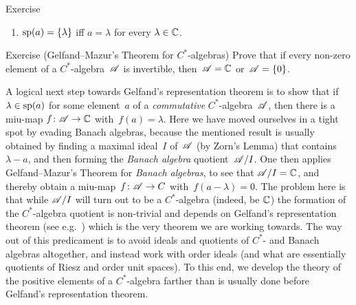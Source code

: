 \documentclass[main]{subfiles}
\begin{document}
\begin{parsec}
\begin{point}{Exercise}
\begin{enumerate}
\item $\mathrm{sp}(a) =\{\lambda\}$ iff $a=\lambda$ for every $\lambda \in\mathbb{C}$.
\end{enumerate}
\end{point}
\begin{point}{Exercise (Gelfand--Mazur's Theorem for $C^*$-algebras)}%
Prove that if every non-zero element of a $C^*$-algebra~$\mathscr{A}$
is invertible, then~$\mathscr{A}=\mathbb{C}$ or~$\mathscr{A}=\{0\}$.
\end{point}
\begin{point}%
A logical next step
towards Gelfand's representation theorem
is to show that if~$\lambda\in\mathrm{sp}(a)$
for some element~$a$ of a \emph{commutative} $C^*$-algebra~$\mathscr{A}$,
then there is a miu-map $f\colon \mathscr{A}\to \mathbb{C}$
with~$f(a)=\lambda$.
Here we have moved ourselves in a tight spot
by evading Banach algebras,
because the mentioned result is usually obtained
by finding a maximal ideal~$I$ of~$\mathscr{A}$
(by Zorn's Lemma) that contains~$\lambda-a$,
and then forming the \emph{Banach algebra} quotient~$\mathscr{A}/I$.
One then applies Gelfand--Mazur's Theorem for \emph{Banach algebras}, 
to see that
$\mathscr{A}/I= \mathbb{C}$,
and thereby obtain a miu-map~$f\colon \mathscr{A}\to C$ with~$f(a-\lambda)=0$.
The problem here is that while $\mathscr{A}/I$
will turn out to be a $C^*$-algebra (indeed, be $\mathbb{C}$)
the formation of the $C^*$-algebra quotient
is non-trivial and depends on Gelfand's representation theorem
(see e.g.~)
which is the very theorem we are working towards.
The way out of this predicament
is to avoid ideals and quotients of $C^*$- and Banach algebras
altogether,
and instead work 
with order ideals (and what are essentially
 quotients of Riesz and order unit spaces).
To this end,
we develop the theory
of the positive elements of a $C^*$-algebra
farther than is usually done
before Gelfand's representation theorem.
\end{point}
\end{parsec}
\end{document}
